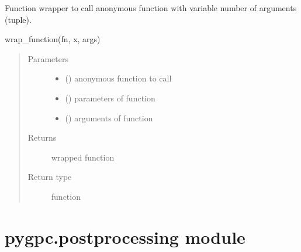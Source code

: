 \documentclass[letterpaper,10pt,english,openany,oneside]{sphinxmanual}
\begin{document}
\begin{fulllineitems}
\label{\detokenize{pygpc:pygpc.misc.wrap_function}}
Function wrapper to call anonymous function with variable number of arguments (tuple).

wrap\_function(fn, x, args)
\begin{quote}\begin{description}
\item[{Parameters}] \leavevmode\begin{itemize}
\item {} 
 () \textendash{} anonymous function to call

\item {} 
 () \textendash{} parameters of function

\item {} 
 () \textendash{} arguments of function

\end{itemize}

\item[{Returns}] \leavevmode
{} \textendash{} wrapped function

\item[{Return type}] \leavevmode
function

\end{description}\end{quote}

\end{fulllineitems}



\section{pygpc.postprocessing module}
\label{\detokenize{pygpc:module-pygpc.postprocessing}}\label{\detokenize{pygpc:pygpc-postprocessing-module}}
\end{document}
